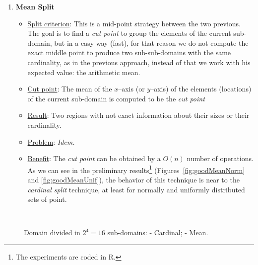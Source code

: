 \begin{enumerate}
\item {\bf Mean Split}
\begin{itemize}
\item \underline{Split criterion}: This is a mid-point strategy between the two previous. The goal is to find a {\it cut point} to group the elements of the current sub-domain, but in a easy way (fast), for that reason we do not compute the exact middle point to produce two sub-sub-domains with the same cardinality, as in the previous approach, instead of that we work with his expected value: the arithmetic mean.
\item \underline{Cut point}: The mean of the $x$--axis (or $y$--axis) of the elements (locations) of the current sub-domain is computed to be the {\it cut point}
\item \underline{Result}: Two regions with not exact information about their sizes or their cardinality.
\item \underline{Problem}: {\it Idem.}
\item \underline{Benefit}: The {\it cut point} can be obtained by a $O(n)$ number of operations. As we can see in the preliminary results\footnote{The experiments are coded in R\cite{Paradis2005}.} (Figures~\ref{fig:goodMeanNorm} and \ref{fig:goodMeanUnif}), the behavior of this technique is near to the {\it cardinal split} technique, at least for normally and uniformly distributed sets of point.
\end{itemize}
\end{enumerate}

\begin{figure}
	\centering
	\hspace{3pt}%
	\\
	\hspace{3pt}%
	\caption[]{Domain divided in $2^4 = 16$ sub-domains:
		 -
		 Cardinal;
		 -	
		 Mean.}%
	\label{fig:goodCard}
\end{figure}

